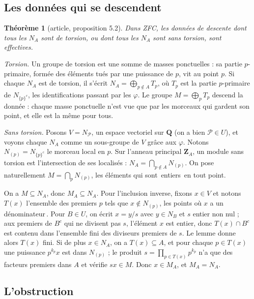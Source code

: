 \documentclass[11pt,a4paper]{amsart}
\theoremstyle{definition}
\theoremstyle{plain}
\newtheorem{theoreme}{Théorème}
\theoremstyle{remark}
\newcommand{\Z}{\mathbf Z}
\newcommand{\Q}{\mathbf Q}
\newcommand{\Pp}{\mathcal P}
\begin{document}
\subsection{Les données qui se descendent}

\begin{theoreme}[article, proposition 5.2]
Dans ZFC, les données de descente dont tous les $N_A$ sont de torsion, ou dont tous les $N_A$ sont sans torsion, sont effectives.
\end{theoreme}

\emph{Torsion.} Un groupe de torsion est une somme de masses ponctuelles : sa partie $p$-primaire, formée des éléments tués par une puissance de $p$, vit au point $p$. Si chaque $N_A$ est de torsion, il s'écrit $N_A=\bigoplus_{p\notin A}T_p$, où $T_p$ est la partie $p$-primaire de $N_{\{p\}^c}$, les identifications passant par les $\varphi$. Le groupe $M=\bigoplus_pT_p$ descend la donnée : chaque masse ponctuelle n'est vue que par les morceaux qui gardent son point, et elle est la même pour tous.

\emph{Sans torsion.} Posons $V=N_\Pp$, un espace vectoriel sur $\Q$ (on a bien $\Pp\in U$), et voyons chaque $N_A$ comme un sous-groupe de $V$ grâce aux $\varphi$. Notons $N_{(p)}=N_{\{p\}^c}$ le morceau local en $p$. Sur l'anneau principal $\Z_A$, un module sans torsion est l'intersection de ses localisés : $N_A=\bigcap_{p\notin A}N_{(p)}$. On pose naturellement $M=\bigcap_pN_{(p)}$, les éléments qui sont \guillemotleft\,entiers\,\guillemotright{} en tout point.

On a $M\subseteq N_A$, donc $M_A\subseteq N_A$. Pour l'inclusion inverse, fixons $x\in V$ et notons $T(x)$ l'ensemble des premiers $p$ tels que $x\notin N_{(p)}$, les points où $x$ a un \guillemotleft\,dénominateur\,\guillemotright{}. Pour $B\in U$, on écrit $x=y/s$ avec $y\in N_B$ et $s$ entier non nul ; aux premiers de $B^c$ qui ne divisent pas $s$, l'élément $x$ est entier, donc $T(x)\cap B^c$ est contenu dans l'ensemble fini des diviseurs premiers de $s$. Le lemme donne alors $T(x)$ fini. Si de plus $x\in N_A$, on a $T(x)\subseteq A$, et pour chaque $p\in T(x)$ une puissance $p^{k_p}x$ est dans $N_{(p)}$ ; le produit $s=\prod_{p\in T(x)}p^{k_p}$ n'a que des facteurs premiers dans $A$ et vérifie $sx\in M$. Donc $x\in M_A$, et $M_A=N_A$.

\subsection{L'obstruction}
\end{document}
